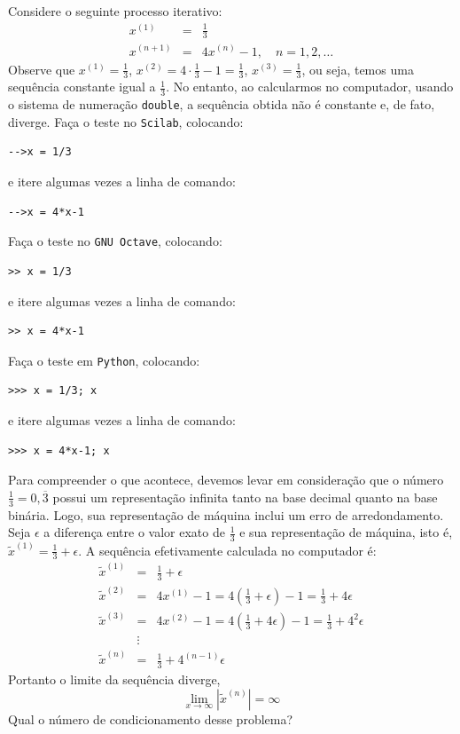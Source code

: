 \begin{ex} Considere o seguinte processo iterativo:
  \begin{eqnarray*}
    x^{(1)} &=& \frac{1}{3}\\
    x^{(n+1)} &=& 4x^{(n)}-1,\quad n=1, 2, \ldots
  \end{eqnarray*}
Observe que $x^{(1)}=\frac{1}{3}$, $x^{(2)}=4\cdot \frac{1}{3}-1=\frac{1}{3}$, $x^{(3)}=\frac{1}{3}$, ou seja, temos uma sequência constante igual a $\frac{1}{3}$. No entanto, ao calcularmos no computador, usando o sistema de numeração \verb+double+, a sequência obtida não é constante e, de fato, diverge.
\ifisscilab
Faça o teste no \verb+Scilab+, colocando:
\begin{verbatim}
-->x = 1/3
\end{verbatim}
e itere algumas vezes a linha de comando:
\begin{verbatim}
-->x = 4*x-1
\end{verbatim}
\fi
\ifisoctave
Faça o teste no \verb+GNU Octave+, colocando:
\begin{verbatim}
>> x = 1/3
\end{verbatim}
e itere algumas vezes a linha de comando:
\begin{verbatim}
>> x = 4*x-1
\end{verbatim}
\fi
\ifispython
Faça o teste em \verb+Python+, colocando:
\begin{verbatim}
>>> x = 1/3; x
\end{verbatim}
e itere algumas vezes a linha de comando:
\begin{verbatim}
>>> x = 4*x-1; x
\end{verbatim}
\fi

Para compreender o que acontece, devemos levar em consideração que o número $\frac{1}{3}=0,\overline{3}$ possui um representação infinita tanto na base decimal quanto na base binária. Logo, sua representação de máquina inclui um erro de arredondamento. Seja $\epsilon$ a diferença entre o valor exato de $\frac{1}{3}$ e sua representação de máquina, isto é, $\tilde{x}^{(1)}=\frac{1}{3}+\epsilon$. A sequência efetivamente calculada no computador é:
\begin{eqnarray*}
\tilde{x}^{(1)}&=&\frac{1}{3}+\epsilon\\
\tilde{x}^{(2)}&=&4x^{(1)}-1=4\left(\frac{1}{3}+\epsilon\right)-1=\frac{1}{3}+4\epsilon\\
\tilde{x}^{(3)}&=&4x^{(2)}-1=4\left(\frac{1}{3}+4\epsilon\right)-1=\frac{1}{3}+4^2\epsilon\\
&\vdots&\\
\tilde{x}^{(n)}&=&\frac{1}{3}+4^{(n-1)}\epsilon
\end{eqnarray*}
Portanto o limite da sequência diverge,
\begin{equation}
\lim_{x\to\infty}|\tilde{x}^{(n)}|=\infty
\end{equation}
Qual o número de condicionamento desse problema?
\end{ex}



